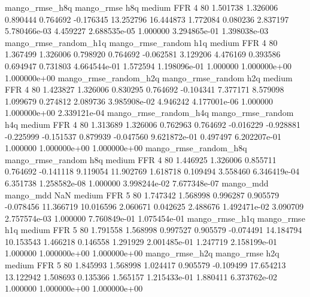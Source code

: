        mango_rmse_h8q        mango_rmse                  h8q     medium      FFR                 4 80  1.501738       1.326006 0.890444       0.764692   -0.176345     13.252796     16.444873     1.772084       0.080236  2.837197 5.780466e-03     4.459227   2.688535e-05            1.000000    3.294865e-01        1.398038e-03
mango_rmse_random_h1q mango_rmse_random                  h1q     medium      FFR                 4 80  1.367499       1.326006 0.798920       0.764692   -0.062581      3.129206      4.476169     0.393586       0.694947  0.731803 4.664544e-01     1.572594   1.198096e-01            1.000000    1.000000e+00        1.000000e+00
mango_rmse_random_h2q mango_rmse_random                  h2q     medium      FFR                 4 80  1.423827       1.326006 0.830295       0.764692   -0.104341      7.377171      8.579098     1.099679       0.274812  2.089736 3.985908e-02     4.946242   4.177001e-06            1.000000    1.000000e+00        2.339121e-04
mango_rmse_random_h4q mango_rmse_random                  h4q     medium      FFR                 4 80  1.313689       1.326006 0.762963       0.764692   -0.016229     -0.928881     -0.225999    -0.151537       0.879939 -0.047560 9.621872e-01     0.497497   6.202207e-01            1.000000    1.000000e+00        1.000000e+00
mango_rmse_random_h8q mango_rmse_random                  h8q     medium      FFR                 4 80  1.446925       1.326006 0.855711       0.764692   -0.141118      9.119054     11.902769     1.618718       0.109494  3.558460 6.346419e-04     6.351738   1.258582e-08            1.000000    3.998244e-02        7.677348e-07
            mango_mdd         mango_mdd                  NaN     medium      FFR                 5 80  1.747342       1.568998 0.996287       0.905579   -0.078456     11.366719     10.016596     2.060671       0.042625  2.488676 1.492471e-02     3.090709   2.757574e-03            1.000000    7.760849e-01        1.075454e-01
       mango_rmse_h1q        mango_rmse                  h1q     medium      FFR                 5 80  1.791558       1.568998 0.997527       0.905579   -0.074491     14.184794     10.153543     1.466218       0.146558  1.291929 2.001485e-01     1.247719   2.158199e-01            1.000000    1.000000e+00        1.000000e+00
       mango_rmse_h2q        mango_rmse                  h2q     medium      FFR                 5 80  1.845993       1.568998 1.024417       0.905579   -0.109499     17.654213     13.122942     1.508693       0.135366  1.565157 1.215433e-01     1.880411   6.373762e-02            1.000000    1.000000e+00        1.000000e+00
